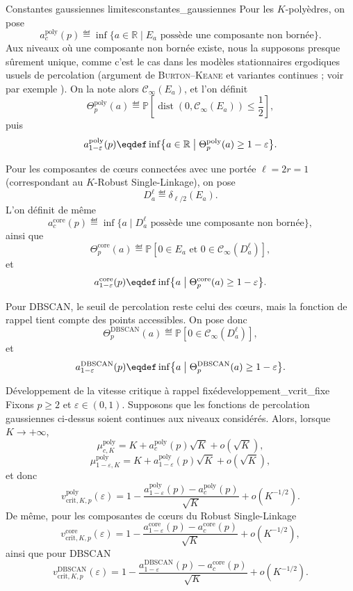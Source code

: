 \begin{Definition}{Constantes gaussiennes limites}{constantes_gaussiennes}
Pour les $K$-polyèdres, on pose
\[
    a_c^{\mathrm{poly}}(p)
    \eqdef
    \inf\{a\in\mathbb R \mid E_a\text{ possède une composante non bornée}\}.
\]
Aux niveaux où une composante non bornée existe, nous la supposons presque sûrement unique, comme c'est le cas dans les modèles stationnaires ergodiques usuels de percolation (argument de \textsc{Burton--Keane} et variantes continues ; voir par exemple \cite{MeesterRoy, Grimmett1999}). On la note alors $\mathcal C_\infty(E_a)$, et l'on définit
\[
    \Theta_p^{\mathrm{poly}}(a)
    \eqdef
    \mathbb P\left[
        \operatorname{dist}\left(0,\mathcal C_\infty(E_a)\right)\le\frac12
    \right],
\]
puis
\[
    a_{1-\varepsilon}^{\mathrm{poly}}(p)
    \eqdef
    \inf\bigl\{a \in \mathbb R \bigm|\Theta_p^{\mathrm{poly}}(a)\ge1-\varepsilon\bigr\}.
\]

Pour les composantes de cœurs connectées avec une portée $\ell=2r=1$ (correspondant au $K$-Robust Single-Linkage), on pose
\[
    D_a^\ell\eqdef\delta_{\ell/2}(E_a).
\]
L'on définit de même
\[
    a_c^{\mathrm{core}}(p)
    \eqdef
    \inf\{a \mid D_a^\ell\text{ possède une composante non bornée}\},
\]
ainsi que
\[
    \Theta_p^{\mathrm{core}}(a)
    \eqdef
    \mathbb P\left[
        0\in E_a
        \text{ et }
        0\in\mathcal C_\infty(D_a^\ell)
    \right],
\]
et
\[
    a_{1-\varepsilon}^{\mathrm{core}}(p)
    \eqdef
    \inf\bigl\{a \bigm|\Theta_p^{\mathrm{core}}(a)\ge1-\varepsilon\bigr\}.
\]

Pour DBSCAN, le seuil de percolation reste celui des cœurs, mais la fonction de rappel tient compte des points accessibles. On pose donc
\[
    \Theta_p^{\mathrm{DBSCAN}}(a)
    \eqdef
    \mathbb P\left[
        0\in\mathcal C_\infty(D_a^\ell)
    \right],
\]
et
\[
    a_{1-\varepsilon}^{\mathrm{DBSCAN}}(p)
    \eqdef
    \inf\bigl\{a \bigm|\Theta_p^{\mathrm{DBSCAN}}(a)\ge1-\varepsilon\bigr\}.
\]
\end{Definition}

\begin{Theoreme}{Développement de la vitesse critique à rappel fixé}{developpement_vcrit_fixe}
Fixons $p\ge2$ et $\varepsilon\in(0,1)$. Supposons que les fonctions de percolation gaussiennes ci-dessus soient continues aux niveaux considérés. Alors, lorsque $K\to+\infty$,
\[
    \mu_{c,K}^{\mathrm{poly}}
    =
    K+a_c^{\mathrm{poly}}(p)\sqrt K+o(\sqrt K),
\]
\[
    \mu_{1-\varepsilon,K}^{\mathrm{poly}}
    =
    K+a_{1-\varepsilon}^{\mathrm{poly}}(p)\sqrt K+o(\sqrt K),
\]
et donc
\[
    v_{\mathrm{crit},K,p}^{\mathrm{poly}}(\varepsilon)
    =
    1-
    \frac{
        a_{1-\varepsilon}^{\mathrm{poly}}(p)-a_c^{\mathrm{poly}}(p)
    }{\sqrt K}
    +o(K^{-1/2}).
\]
De même, pour les composantes de cœurs du Robust Single-Linkage 
\[
    v_{\mathrm{crit},K,p}^{\mathrm{core}}(\varepsilon)
    =
    1-
    \frac{
        a_{1-\varepsilon}^{\mathrm{core}}(p)-a_c^{\mathrm{core}}(p)
    }{\sqrt K}
    +o(K^{-1/2}),
\]
ainsi que pour DBSCAN
\[
    v_{\mathrm{crit},K,p}^{\mathrm{DBSCAN}}(\varepsilon)
    =
    1-
    \frac{
        a_{1-\varepsilon}^{\mathrm{DBSCAN}}(p)-a_c^{\mathrm{core}}(p)
    }{\sqrt K}
    +o(K^{-1/2}).
\]
\end{Theoreme}

